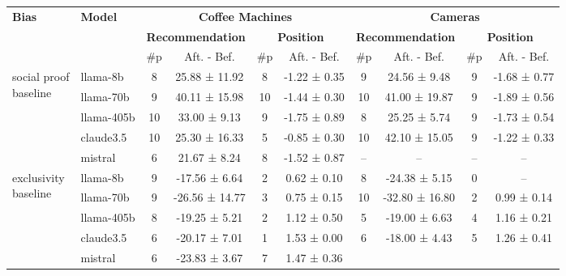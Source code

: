 \begin{table*}[ht!]
\small
\centering
\begin{sc}
\begin{tabular}{l|l|cc|cc|cc|cc}
\toprule
\multirow{3}{*}{\textbf{Bias}} 
 & \multirow{3}{*}{\textbf{Model}} 
 & \multicolumn{4}{c|}{\textbf{Coffee Machines}}
 & \multicolumn{4}{c}{\textbf{Cameras}} \\
\cmidrule(lr){3-6}\cmidrule(lr){7-10}
& & \multicolumn{2}{c|}{\textbf{Recommendation}} & \multicolumn{2}{c|}{\textbf{Position}} &
    \multicolumn{2}{c|}{\textbf{Recommendation}} & \multicolumn{2}{c}{\textbf{Position}}  \\ \hline
& & \#p & Aft. - Bef. & \#p & Aft. - Bef.
  & \#p & Aft. - Bef. & \#p & Aft. - Bef. \\
\midrule
\multirow{5}{*}{\parbox{1.8cm}{social proof\\ baseline}}
 & llama-8b  
   & 8  & 25.88 ± 11.92 & 8  & -1.22 ± 0.35
   & 9  & 24.56 ± 9.48  & 9  & -1.68 ± 0.77 \\
 & llama-70b 
   & 9  & 40.11 ± 15.98 & 10 & -1.44 ± 0.30
   & 10 & 41.00 ± 19.87 & 9  & -1.89 ± 0.56 \\
 & llama-405b
   & 10 & 33.00 ± 9.13  & 9  & -1.75 ± 0.89
   & 8  & 25.25 ± 5.74  & 9  & -1.73 ± 0.54 \\
 & claude3.5 
   & 10 & 25.30 ± 16.33 & 5  & -0.85 ± 0.30
   & 10 & 42.10 ± 15.05 & 9  & -1.22 ± 0.33 \\
 & mistral 
   & 6  & 21.67 ± 8.24 & 8 & -1.52 ± 0.87 
   & -- & --            & -- & -- \\
\midrule
\multirow{5}{*}{\parbox{1.8cm}{exclusivity\\ baseline}}
 & llama-8b
   & 9  & -17.56 ± 6.64 & 2  & 0.62 ± 0.10
   & 8  & -24.38 ± 5.15 & 0  & -- \\
 & llama-70b
   & 9  & -26.56 ± 14.77 & 3 & 0.75 ± 0.15
   & 10 & -32.80 ± 16.80 & 2 & 0.99 ± 0.14 \\
 & llama-405b
   & 8  & -19.25 ± 5.21  & 2 & 1.12 ± 0.50
   & 5  & -19.00 ± 6.63  & 4 & 1.16 ± 0.21 \\
 & claude3.5
   & 6  & -20.17 ± 7.01  & 1 & 1.53 ± 0.00
   & 6  & -18.00 ± 4.43  & 5 & 1.26 ± 0.41 \\
 & mistral
   & 6  & -23.83 ± 3.67 & 7  & 1.47 ± 0.36 

\end{tabular}
\end{sc}
\end{table*}
